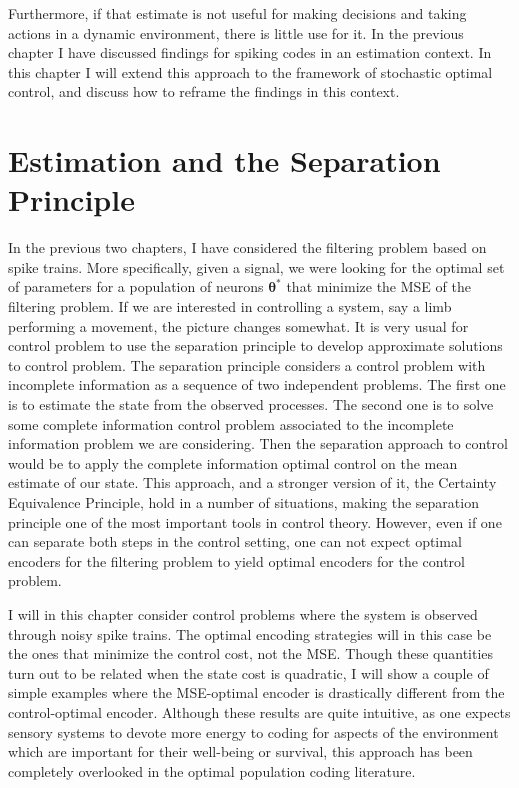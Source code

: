  Furthermore, if that estimate is not useful for making decisions and taking actions in a dynamic environment, there is little use for it. In the previous chapter I have discussed findings for spiking codes in an estimation context. In this chapter I will extend this approach to the framework of stochastic optimal control, and discuss how to reframe the findings in this context.\par

\section{Estimation and the Separation Principle}

In the previous two chapters, I have considered the filtering problem based on spike trains. More specifically, given a signal, we were looking for the optimal set of parameters for a population of neurons $\boldsymbol{\theta}^*$ that minimize the MSE of the filtering problem. If we are interested in controlling a system, say a limb performing a movement, the picture changes somewhat. It is very usual for control problem to use the separation principle\cite{Bar-Shalom1974} to develop approximate solutions to control problem. The separation principle considers a control problem with incomplete information as a sequence of two independent problems. The first one is to estimate the state from the observed processes. The second one is to solve some complete information control problem associated to the incomplete information problem we are considering. Then the separation approach to control would be to apply the complete information optimal control on the mean estimate of our state. This approach, and a stronger version of it, the Certainty Equivalence Principle, hold in a number of situations, making the separation principle one of the most important tools in control theory. However, even if one can separate both steps in the control setting, one can not expect optimal encoders for the filtering problem to yield optimal encoders for the control problem.\par
I will in this chapter consider control problems where the system is observed through noisy spike trains. The optimal encoding strategies will in this case be the ones that minimize the control cost, not the MSE. Though these quantities turn out to be related when the state cost is quadratic, I will show a couple of simple examples where the MSE-optimal encoder is drastically different from the control-optimal encoder. Although these results are quite intuitive, as one expects sensory systems to devote more energy to coding for aspects of the environment which are important for their well-being or survival, this approach has been completely overlooked in the optimal population coding literature.

